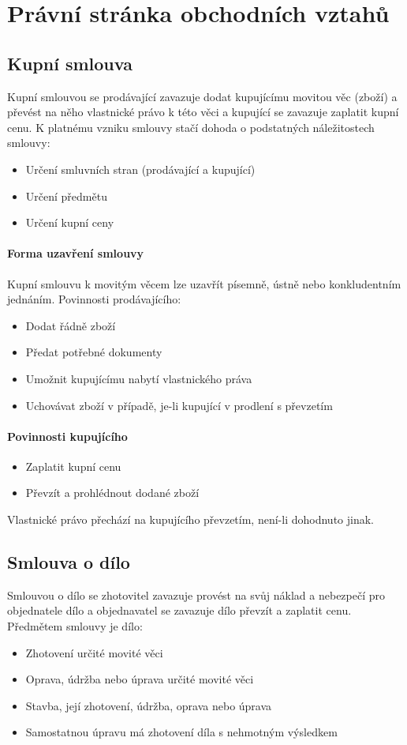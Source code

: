 \documentclass[11pt,a4paper,twoside]{book}
\begin{document}
	\section*{Právní stránka obchodních vztahů}
	\subsection*{Kupní smlouva}
	Kupní smlouvou se prodávající zavazuje dodat kupujícímu movitou věc (zboží) a převést na něho vlastnické právo k této věci a kupující se zavazuje zaplatit kupní cenu. K platnému vzniku smlouvy stačí dohoda o podstatných náležitostech smlouvy:
	\begin{itemize}
		\item Určení smluvních stran (prodávající a kupující)
		\item Určení předmětu
		\item Určení kupní ceny
	\end{itemize}

	\paragraph*{Forma uzavření smlouvy}
	Kupní smlouvu k movitým věcem lze uzavřít písemně, ústně nebo konkludentním jednáním.
	Povinnosti prodávajícího:
	\begin{itemize}
		\item Dodat řádně zboží
		\item Předat potřebné dokumenty
		\item Umožnit kupujícímu nabytí vlastnického práva
		\item Uchovávat zboží v případě, je-li kupující v prodlení s převzetím	
	\end{itemize}

	\paragraph*{Povinnosti kupujícího}
	\begin{itemize}
		\item Zaplatit kupní cenu
		\item Převzít a prohlédnout dodané zboží
	\end{itemize}
	Vlastnické právo přechází na kupujícího převzetím, není-li dohodnuto jinak.

	\subsection*{Smlouva o dílo}
	Smlouvou o dílo se zhotovitel zavazuje provést na svůj náklad a nebezpečí pro objednatele dílo a objednavatel se zavazuje dílo převzít a zaplatit cenu.
	Předmětem smlouvy je dílo:
	\begin{itemize}
		\item Zhotovení určité movité věci
		\item Oprava, údržba nebo úprava určité movité věci
		\item Stavba, její zhotovení, údržba, oprava nebo úprava
		\item Samostatnou úpravu má zhotovení díla s nehmotným výsledkem
	\end{itemize}
\end{document}
